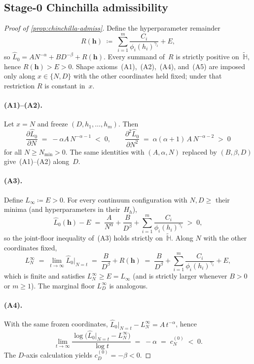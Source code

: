 \documentclass[11pt]{article}
\newcommand{\bbH}{\mathbb{H}}
\newcommand{\Lhat}{\hat{L}}
\theoremstyle{plain}
\theoremstyle{remark}
\begin{document}
\subsection{Stage-0 Chinchilla admissibility}\label{sec:chinchilla-proof}
\begin{proof}[Proof of \cref{prop:chinchilla-admiss}]
Define the hyperparameter remainder
\[
    R(\mathbf{h})
    \;\coloneqq\;
    \sum_{i=1}^{m} \frac{C_i}{\phi_i(h_i)^{\gamma_i}} + E,
\]
so $\Lhat_0 = A N^{-\alpha} + B D^{-\beta} + R(\mathbf{h})$.
Every summand of~$R$ is strictly positive on~$\widetilde{\bbH}$, hence $R(\mathbf{h}) > E > 0$.
Shape axioms~(A1),~(A2),~(A4), and~(A5) are imposed only along $x \in \{N,D\}$ with the other coordinates held fixed; under that restriction $R$ is constant in~$x$.

\paragraph{(A1)--(A2).}
Let $x = N$ and freeze $(D,h_1,\ldots,h_m)$. Then
\[
    \frac{\partial \Lhat_0}{\partial N}
    \;=\;
    -\alpha A\, N^{-\alpha-1}
    \;<\; 0,
    \qquad
    \frac{\partial^2 \Lhat_0}{\partial N^2}
    \;=\;
    \alpha(\alpha+1)\, A\, N^{-\alpha-2}
    \;>\; 0
\]
for all $N \geq N_{\min} > 0$. The same identities with $(A,\alpha,N)$ replaced by $(B,\beta,D)$ give~(A1)--(A2) along~$D$.

\paragraph{(A3).}
Define $L_\infty \coloneqq E > 0$. For every continuum configuration with $N,D \geq$ their minima
(and hyperparameters in their~$H_h$),
\[
    \Lhat_0(\mathbf{h}) - E
    \;=\;
    \frac{A}{N^{\alpha}} + \frac{B}{D^{\beta}}
    + \sum_{i=1}^{m} \frac{C_i}{\phi_i(h_i)^{\gamma_i}}
    \;>\; 0,
\]
so the joint-floor inequality of~(A3) holds strictly on~$\widetilde{\bbH}$.
Along $N$ with the other coordinates fixed,
\[
    L^{\infty}_{N}
    \;=\;
    \lim_{t\to\infty} \Lhat_0\big|_{N=t}
    \;=\;
    \frac{B}{D^{\beta}} + R(\mathbf{h})
    \;=\;
    \frac{B}{D^{\beta}}
    + \sum_{i=1}^{m} \frac{C_i}{\phi_i(h_i)^{\gamma_i}} + E,
\]
which is finite and satisfies $L^{\infty}_{N} \geq E = L_\infty$ (and is strictly larger whenever $B>0$ or $m\geq 1$).
The marginal floor $L^{\infty}_{D}$ is analogous.

\paragraph{(A4).}
With the same frozen coordinates,
$\Lhat_0\big|_{N=t} - L^{\infty}_{N} = A\, t^{-\alpha}$, hence
\[
    \lim_{t\to\infty}
    \frac{\log\bigl(\Lhat_0\big|_{N=t} - L^{\infty}_{N}\bigr)}{\log t}
    \;=\; -\alpha \;=\; c_N^{(0)} \;<\; 0.
\]
The $D$-axis calculation yields $c_D^{(0)} = -\beta < 0$.


\end{proof}
\end{document}
